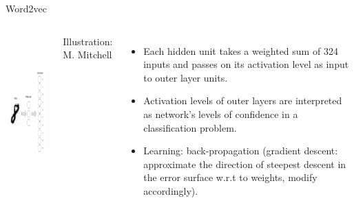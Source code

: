 \documentclass[
  10pt,
  ignorenonframetext,
  x11names, dvipsnames, bibspacing, natbib, table]{beamer}
\begin{document}
\begin{frame}{Word2vec}
\protect\hypertarget{word2vec-3}{}
\begin{columns}
    
    

\begin{center}
 \includegraphics[height = 6cm, width = 5cm]{images/perceptron2.png}
\end{center}


\vspace{-3mm}
\tiny \hfill \color{gray}Illustration: M. Mitchell \color{black}




\footnotesize 

\begin{itemize}
\item Each hidden unit takes a weighted sum of 324 inputs and passes on its activation level as input to outer layer units. 

\item Activation levels of outer layers are interpreted as network's levels of confidence in a classification problem.

\item Learning: back-propagation (gradient descent: approximate  the direction of steepest descent in the error surface w.r.t to weights, modify accordingly).
\end{itemize}

\end{columns}
\end{frame}
\end{document}
